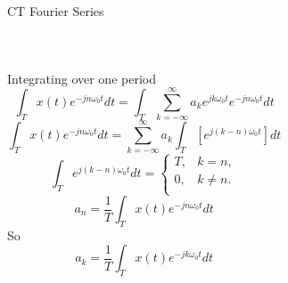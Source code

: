 \begin{frame}[plain]{CT Fourier Series}
\begin{columns}
{            }

    \end{columns}


\end{frame}


\begin{frame}[plain]
    \begin{columns}
            {
                Integrating over one period
                \begin{equation*}
                    \int_{T}x(t)e^{-jn\omega_0t}dt = \int_{T}\sum_{k=-\infty}^{\infty}a_k e^{jk\omega_0 t}e^{-jn\omega_0t}dt
                \end{equation*}
                \pause
                \begin{equation*}
                    \int_{T}x(t)e^{-jn\omega_0t}dt = \sum_{k=-\infty}^{\infty}a_k \int_{T} \left[e^{j(k-n)\omega_0 t}\right]dt
                \end{equation*}
                \pause
                \begin{equation*}
                    \int_{T} e^{j(k-n)\omega_0 t} dt = \begin{cases}T, & k = n,\\ 0, & k \neq n.\\\end{cases}
                \end{equation*}
                \pause
                \begin{equation*}
                    a_n = \frac{1}{T}\int_{T} x(t) e^{-jn\omega_0 t}dt
                \end{equation*}
                So
                \pause
                \begin{equation*}
                    a_k = \frac{1}{T}\int_{T} x(t) e^{-jk\omega_0 t}dt
                \end{equation*}


            }
            {



            }

    \end{columns}
\end{frame}


%


